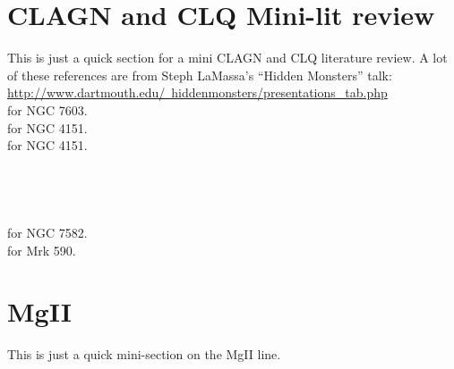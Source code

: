 \documentclass[11pt]{article}
\begin{document}
\newpage
\section{CLAGN and CLQ Mini-lit review} 
This is just a quick section for a mini CLAGN and CLQ literature review. 
A lot of these references are from Steph LaMassa's ``Hidden Monsters'' talk:
\href{http://www.dartmouth.edu/~hiddenmonsters/presentations\_tab.php}{http://www.dartmouth.edu/~hiddenmonsters/presentations\_tab.php}\\

\noindent
\citet{TohlineOsterbrock76} for NGC 7603.\\
\citet{PenstonPerez84} for NGC 4151.\\
\citet{Goodrich95} for NGC 4151.\\
\citet{Tran92}\\
\citet{Storchi-Bergmann93}\\
\citet{EracleousHalpern01}\\
\citet{Shappee14}\\
\citet{Aretxaga99} for NGC 7582.\\
\citet{Denney14} for Mrk 590.\\



\newpage
\section{MgII} 
This is just a quick mini-section on the MgII line. 
\end{document}
